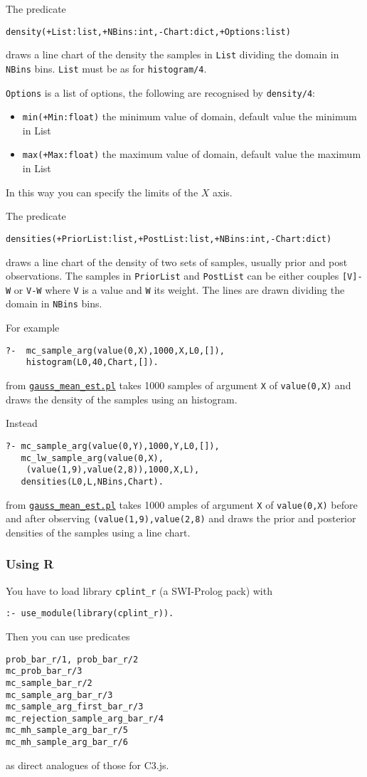 The predicate
\begin{verbatim}
density(+List:list,+NBins:int,-Chart:dict,+Options:list)
\end{verbatim}
draws a line chart of the density the samples in \verb|List| dividing the domain in
 \verb|NBins| bins.
\verb|List| must be as for \verb|histogram/4|.

\verb|Options| is a list of options, the following are recognised by \verb|density/4|:
\begin{itemize}
\item \verb|min(+Min:float)|
the minimum value of domain, default value the minimum in List
\item \verb|max(+Max:float)|
the maximum value of domain, default value the maximum in List
\end{itemize}
In this way you can specify the limits of the $X$ axis.

The predicate
\begin{verbatim}
densities(+PriorList:list,+PostList:list,+NBins:int,-Chart:dict)
\end{verbatim}
draws a line chart of the density of two sets of samples, usually
 prior and post observations. The samples in \verb|PriorList| and \verb|PostList|
can be either couples \verb|[V]-W| or \verb|V-W| where \verb|V| is a value and \verb|W| its weight.
 The lines are drawn dividing the domain in
 \verb|NBins| bins.

For example
\begin{verbatim}
?-  mc_sample_arg(value(0,X),1000,X,L0,[]),
    histogram(L0,40,Chart,[]).
\end{verbatim}
from \href{http://cplint.ml.unife.it/example/inference/gauss_mean_est.pl}{\texttt{gauss\_mean\_est.pl}}
takes 1000 samples of argument \verb|X| of \verb|value(0,X)| and draws the density of the samples using an histogram.

Instead
\begin{verbatim}
?- mc_sample_arg(value(0,Y),1000,Y,L0,[]),
   mc_lw_sample_arg(value(0,X),
    (value(1,9),value(2,8)),1000,X,L),
   densities(L0,L,NBins,Chart).
\end{verbatim}
from \href{http://cplint.ml.unife.it/example/inference/gauss_mean_est.pl}{\texttt{gauss\_mean\_est.pl}}
takes 1000 amples of argument \verb|X| of \verb|value(0,X)| before and after observing
\verb|(value(1,9),value(2,8)| and draws the prior and posterior densities of the samples using a line chart.

\subsubsection{Using R}
You have to load library \texttt{cplint\_r}  (a SWI-Prolog pack) with
\begin{verbatim}
:- use_module(library(cplint_r)).
\end{verbatim}
Then you can use predicates
\begin{verbatim}
prob_bar_r/1, prob_bar_r/2
mc_prob_bar_r/3
mc_sample_bar_r/2
mc_sample_arg_bar_r/3
mc_sample_arg_first_bar_r/3
mc_rejection_sample_arg_bar_r/4
mc_mh_sample_arg_bar_r/5
mc_mh_sample_arg_bar_r/6
\end{verbatim}
as direct analogues of those for C3.js.

